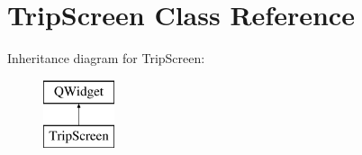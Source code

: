 \hypertarget{class_trip_screen}{}\section{Trip\+Screen Class Reference}
\label{class_trip_screen}
Inheritance diagram for Trip\+Screen\+:\begin{figure}[H]
\begin{center}
\leavevmode
\includegraphics[height=2.000000cm]{class_trip_screen}
\end{center}
\end{figure}
